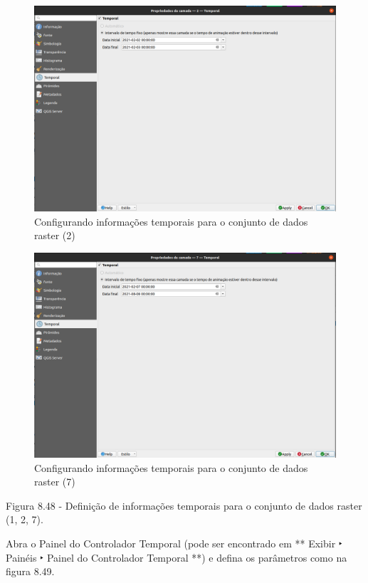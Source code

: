 \documentclass[
]{book}
\begin{document}
\begin{figure}
\centering
\includegraphics{media/modulo8/fig848_b.png}
\caption{Configurando informações temporais para o conjunto de dados raster (2)}
\end{figure}

\begin{figure}
\centering
\includegraphics{media/modulo8/fig848_c.png}
\caption{Configurando informações temporais para o conjunto de dados raster (7)}
\end{figure}

Figura 8.48 - Definição de informações temporais para o conjunto de dados raster (1, 2, 7).

Abra o Painel do Controlador Temporal (pode ser encontrado em ** Exibir ‣ Painéis ‣ Painel do Controlador Temporal **) e defina os parâmetros como na figura 8.49.
\end{document}
